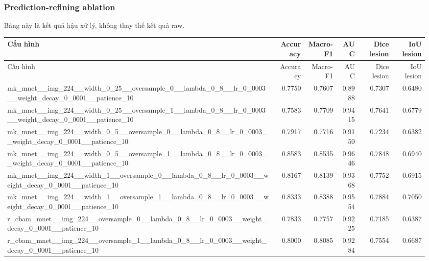 \subsubsection*{Prediction-refining ablation}
Bảng này là kết quả hậu xử lý, không thay thế kết quả raw.
\scriptsize
\begin{longtable}{p{5.0cm}rrrrr}
\toprule
Cấu hình & Accuracy & Macro-F1 & AUC & Dice lesion & IoU lesion \\
\midrule
\endfirsthead
\toprule
Cấu hình & Accuracy & Macro-F1 & AUC & Dice lesion & IoU lesion \\
\midrule
\endhead
mk\_mnet\_\_img\_224\_\_width\_0\_25\_\_oversample\_0\_\_lambda\_0\_8\_\_lr\_0\_0003\_\_weight\_decay\_0\_0001\_\_patience\_10 & 0.7750 & 0.7607 & 0.8988 & 0.7307 & 0.6480 \\
mk\_mnet\_\_img\_224\_\_width\_0\_25\_\_oversample\_1\_\_lambda\_0\_8\_\_lr\_0\_0003\_\_weight\_decay\_0\_0001\_\_patience\_10 & 0.7583 & 0.7709 & 0.9415 & 0.7641 & 0.6779 \\
mk\_mnet\_\_img\_224\_\_width\_0\_5\_\_oversample\_0\_\_lambda\_0\_8\_\_lr\_0\_0003\_\_weight\_decay\_0\_0001\_\_patience\_10 & 0.7917 & 0.7716 & 0.9150 & 0.7234 & 0.6382 \\
mk\_mnet\_\_img\_224\_\_width\_0\_5\_\_oversample\_1\_\_lambda\_0\_8\_\_lr\_0\_0003\_\_weight\_decay\_0\_0001\_\_patience\_10 & 0.8583 & 0.8535 & 0.9646 & 0.7848 & 0.6940 \\
mk\_mnet\_\_img\_224\_\_width\_1\_\_oversample\_0\_\_lambda\_0\_8\_\_lr\_0\_0003\_\_weight\_decay\_0\_0001\_\_patience\_10 & 0.8167 & 0.8139 & 0.9368 & 0.7752 & 0.6915 \\
mk\_mnet\_\_img\_224\_\_width\_1\_\_oversample\_1\_\_lambda\_0\_8\_\_lr\_0\_0003\_\_weight\_decay\_0\_0001\_\_patience\_10 & 0.8333 & 0.8388 & 0.9554 & 0.7884 & 0.7050 \\
r\_cbam\_mnet\_\_img\_224\_\_oversample\_0\_\_lambda\_0\_8\_\_lr\_0\_0003\_\_weight\_decay\_0\_0001\_\_patience\_10 & 0.7833 & 0.7757 & 0.9225 & 0.7185 & 0.6387 \\
r\_cbam\_mnet\_\_img\_224\_\_oversample\_1\_\_lambda\_0\_8\_\_lr\_0\_0003\_\_weight\_decay\_0\_0001\_\_patience\_10 & 0.8000 & 0.8085 & 0.9284 & 0.7554 & 0.6687 \\
\bottomrule
\end{longtable}
\normalsize

